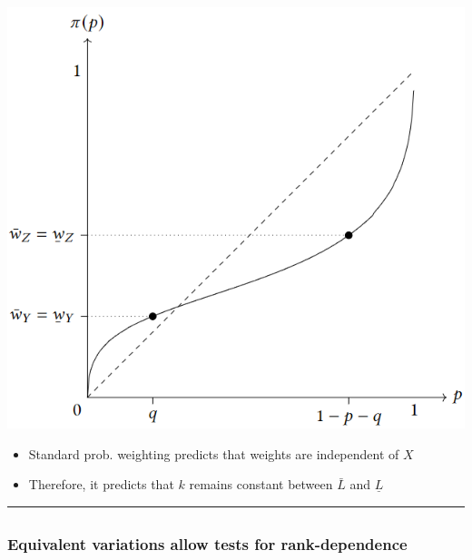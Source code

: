 \documentclass[
  letterpaper,
  DIV=11,
  numbers=noendperiod]{scrartcl}
\providecommand{\tightlist}{%
  \setlength{\itemsep}{0pt}\setlength{\parskip}{0pt}}\usepackage{longtable,booktabs,array}
\begin{document}
\includegraphics[width=0.95\linewidth,height=\textheight,keepaspectratio]{figures/PTWeights.png}

\begin{itemize}
\tightlist
\item
  Standard prob. weighting predicts that weights are independent of
  \(X\)
\item
  Therefore, it predicts that \(k\) remains constant between \(\bar{L}\)
  and \(\underline{L}\)
\end{itemize}

\begin{center}\rule{0.5\linewidth}{0.5pt}\end{center}

\subsection{}\label{section-20}

\subsubsection{Equivalent variations allow tests for
rank-dependence}\label{equivalent-variations-allow-tests-for-rank-dependence-2}
\end{document}

